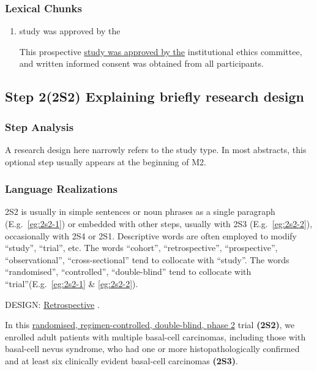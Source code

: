 \documentclass[a4paper]{ctexbook}
\begin{document}
    \subsubsection{Lexical Chunks}

    \begin{enumerate}
      \item study was approved by the
      \begin{eg}
        This prospective \uline{study was approved by the} institutional ethics committee, and written informed consent was obtained from all participants.
      \end{eg}
    \end{enumerate}

  \subsection{Step 2(2S2) Explaining briefly research design}

    \subsubsection{Step Analysis}

    A research design here narrowly refers to the study type. In most abstracts, this optional step usually appears at the beginning of M2.

    \subsubsection{Language Realizations}

    2S2 is usually in simple sentences or noun phrases as a single paragraph (E.g.~\ref{eg:2s2-1}) or embedded with other steps, usually with 2S3 (E.g.~\ref{eg:2s2-2}), occasionally with 2S4 or 2S1. Descriptive words are often employed to modify ``study'', ``trial'', etc. The words ``cohort'', ``retrospective'', ``prospective'', ``observational'', ``cross-sectional'' tend to collocate with ``study''. The words ``randomised'', ``controlled'', ``double-blind'' tend to collocate with ``trial''(E.g.~\ref{eg:2s2-1} \& \ref{eg:2s2-2}).

    \begin{eg}[label={eg:2s2-1}]{}
      DESIGN: \uline{Retrospective} .
    \end{eg}

    \begin{eg}[label={eg:2s2-2}]{}
      In this \uline{randomised, regimen-controlled, double-blind, phase 2} trial \textbf{(2S2)}, we enrolled adult patients with multiple basal-cell carcinomas, including those with basal-cell nevus syndrome, who had one or more histopathologically confirmed and at least six clinically evident basal-cell carcinomas \textbf{(2S3)}.
    \end{eg}
\end{document}
